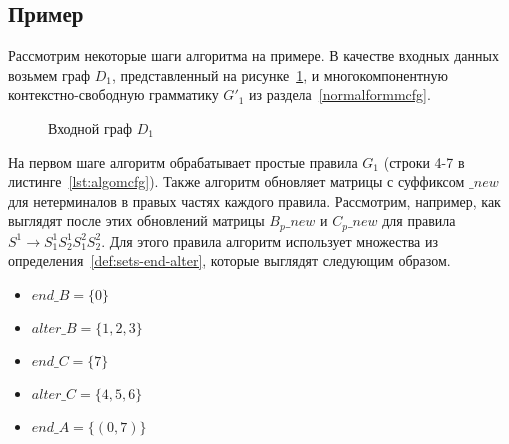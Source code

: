 


\subsection{Пример}

Рассмотрим некоторые шаги алгоритма на примере. В качестве входных данных возьмем граф $D_1$, представленный на рисунке~\ref{fig:example_input_graph_mcfg}, и многокомпонентную контекстно-свободную грамматику $G'_1$ из раздела~\ref{normalformmcfg}.

\begin{figure}[h]
	\centering
	\caption{Входной граф $D_1$}
	\label{fig:example_input_graph_mcfg}
\end{figure}

На первом шаге алгоритм обрабатывает простые правила $G_1$ (строки 4-7 в листинге~\ref{lst:algomcfg}). Также алгоритм обновляет матрицы с суффиксом $\_new$ для нетерминалов в правых частях каждого правила. Рассмотрим, например, как выглядят после этих обновлений матрицы $B_p\_new$ и $C_p\_new$ для правила $S^1 \rightarrow S_1^1 S_2^1 S_1^2 S_2^2$. Для этого правила алгоритм использует множества из определения~\ref{def:sets-end-alter}, которые выглядят следующим образом.

\begin{center}
	\begin{itemize}
		\item $end\_B = \{0\}$
		\item $alter\_B = \{1,2,3\}$
		\item $end\_C = \{7\}$
		\item $alter\_C = \{4,5,6\}$
		\item $end\_A = \{(0, 7)\}$
	\end{itemize}
\end{center}

